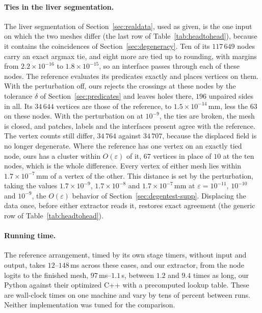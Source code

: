 \documentclass[11pt]{article}
\theoremstyle{definition}
\begin{document}
\paragraph*{Ties in the liver segmentation.} The liver segmentation of
Section~\ref{sec:realdata}, used as given, is the one input on which the two
meshes differ (the last row of Table~\ref{tab:headtohead}), because it
contains the coincidences of
Section~\ref{sec:degeneracy}. Ten of its $117\,649$ nodes carry an exact
argmax tie, and eight more are tied up to rounding, with margins from
$2.2\times10^{-16}$ to $1.8\times10^{-15}$, so an interface passes through
each of these nodes. The reference evaluates its predicates exactly and
places vertices on them. With the perturbation off, ours rejects the
crossings at these nodes by the tolerance $\delta$ of
Section~\ref{sec:predicates} and leaves holes there, $196$ unpaired sides in
all. Its $34\,644$ vertices are those of the reference, to
$1.5\times10^{-14}$\,mm, less the $63$ on these nodes. With the perturbation
on at $10^{-9}$, the ties are broken, the mesh is closed, and patches, labels
and the interfaces present agree with the reference. The vertex counts still
differ, $34\,764$ against $34\,707$, because the displaced field is no longer
degenerate. Where the reference has one vertex on an exactly tied node, ours
has a cluster within $O(\varepsilon)$ of it, $67$ vertices in place of $10$
at the ten nodes, which is the whole difference. Every vertex of either mesh
lies within $1.7\times10^{-7}$\,mm of a vertex of the other. This distance is
set by the perturbation, taking the values $1.7\times10^{-9}$,
$1.7\times10^{-8}$ and $1.7\times10^{-7}$\,mm at $\varepsilon = 10^{-11}$,
$10^{-10}$ and $10^{-9}$, the $O(\varepsilon)$ behavior of
Section~\ref{sec:degentest-supp}. Displacing the data once,
before either extractor reads it, restores exact agreement (the generic row
of Table~\ref{tab:headtohead}).

\paragraph*{Running time.} The reference arrangement, timed by its own stage
timers, without input and output, takes $12$--$148$\,ms across these
cases, and our extractor, from the node logits to the finished mesh,
$97$\,ms--$1.1$\,s, between $1.2$ and $9.4$ times as long, our Python
against their optimized C++ with a precomputed lookup table. These are
wall-clock times on one machine and vary by tens of percent between runs.
Neither implementation was tuned for the comparison.
\end{document}
